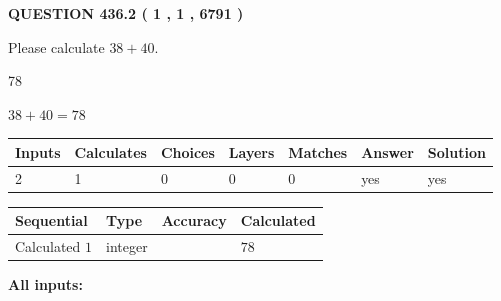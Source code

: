 \documentclass[12pt]{article}
\begin{document}
   
  
\vspace{0.2in}
  
{\textbf{\Large{QUESTION
436.2 
 ( 1 , 1 , 6791 )
}}}
  
  
 
Please calculate $ %
38 +  %
40 $.
 
 
 
\noindent{}
 
 

78
 
 
\noindent{}
 
 

 
 
 
\noindent{}
 
 

$ %
38 +  %
40=   %
78$
 
 
\noindent{}
 
 

 
   
   
   
   
\noindent\begin{tabular}{|l|l|l|l|l|l|l|}
 \hline
Inputs & Calculates & Choices & Layers & Matches & Answer & Solution \\ \hline
 2  & 
 1  & 
 0
  & 
 0  & 
 0  & 
  yes & 
  yes 
  \\ \hline
 \end{tabular}
   
   
   
   
\noindent{}
   
   
  
  
\noindent\begin{tabular}{|l|l|l|l|}
\hline
 Sequential & Type & Accuracy & Calculated \\ 
\hline
 
 
  Calculated $  1 $ & integer &  & 
  $ 78 $ 
 \\  \hline  
 \end{tabular}
   
   
   
   
\noindent\vspace{0.1in}\hspace{-0.08in} {\textbf{\Large{All inputs: }}}
   
\end{document}
